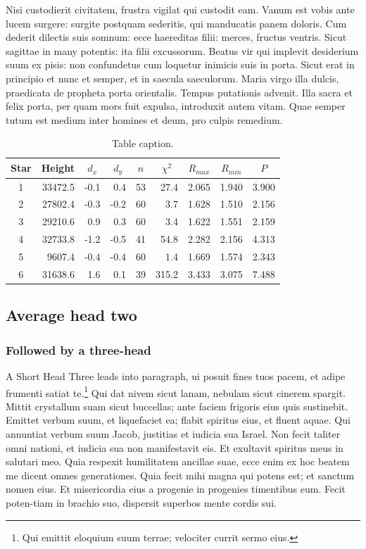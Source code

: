 \documentclass{nejsds}
\theoremstyle{remark}
\begin{document}
Nisi custodierit civitatem, frustra vigilat qui custodit eam. Vanum
est vobis ante lucem surgere: surgite postquam sederitis, qui
manducatis panem doloris. Cum dederit dilectis suis somnum: ecce
haereditas filii: merces, fructus ventris. Sicut sagittae in many
potentis: ita filii excussorum. Beatus vir qui implevit desiderium
suum ex pisis: non confundetus cum loquetur inimicis suis in porta.
Sicut erat in principio et nunc et semper, et in saecula saeculorum.
Maria virgo illa dulcis, praedicata de propheta porta orientalis.
Tempus putationis advenit.  Illa sacra et felix porta, per quam mors
fuit expulsa, introduxit autem vitam.  Quae semper tutum est medium
inter homines et deum, pro culpis remedium.


\begin{table}
\caption{Table caption.}\label{tbl-2}
\begin{tabular*}{\textwidth}{@{\extracolsep{\fill}}crrrrrrrr@{}}
\hline
\hline
Star & Height & \multicolumn{1}{c}{$d_{x}$} &
\multicolumn{1}{c}{$d_{y}$} &
\multicolumn{1}{c}{$n$} &
\multicolumn{1}{c}{$\chi^2$} &
\multicolumn{1}{c}{$R_{max}$} &
\multicolumn{1}{c}{$R_{min}$} &
\multicolumn{1}{c}{$P$}  \\
\hline
1 &33472.5 &-0.1 &0.4  &53 &27.4  &2.065  &1.940 &3.900\\
2 &27802.4 &-0.3 &-0.2 &60 &3.7   &1.628  &1.510 &2.156\\
3 &29210.6 &0.9  &0.3  &60 &3.4   &1.622  &1.551 &2.159\\
4 &32733.8 &-1.2 &-0.5 &41 &54.8  &2.282  &2.156 &4.313\\
5 & 9607.4 &-0.4 &-0.4 &60 &1.4   &1.669  &1.574 &2.343\\
6 &31638.6 &1.6  &0.1  &39 &315.2 & 3.433 &3.075 &7.488\\
\hline
\end{tabular*}
\end{table}


\subsection{Average head two}

\subsubsection{Followed by a three-head}

A Short Head Three leads into paragraph, ui posuit fines tuos pacem,
et adipe frumenti satiat te.\footnote{Qui emittit eloquium suum terrae;
velociter currit sermo eius.} Qui dat nivem sicut lanam, nebulam
sicut cinerem spargit. Mittit crystallum suam sicut buccellas; ante
faciem frigoris eius quis sustinebit. Emittet verbum suum, et
liquefaciet ea; flabit spiritus eius, et fluent aquae. Qui annuntiat
verbum suum Jacob, justitias et iudicia sua Israel. Non fecit taliter omni
nationi, et iudicia sua non manifestavit eis. Et exultavit spiritus meus
in salutari meo.  Quia respexit humilitatem ancillae suae, ecce enim ex
hoc beatem me dicent omnes generationes. Quia fecit mihi magna qui potens
est; et sanctum nomen eius. Et misericordia eius a progenie in progenies
timentibus eum. Fecit poten-tiam in brachio suo, dispersit superbos mente
cordis sui.
\end{document}
